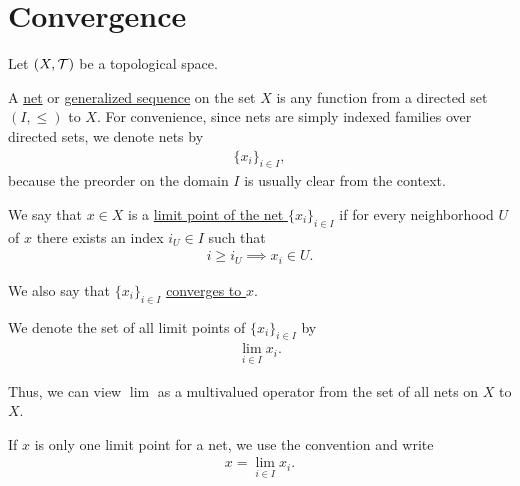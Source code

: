 \section{Convergence}\label{sec:convergence}

Let $(X, \mathcal T)$ be a topological space.

\begin{definition}\label{def:topological_net}\cite[49]{Engelking1989}
  A \ul{net} or \ul{generalized sequence} on the set $X$ is any function from a directed set $(I, \leq)$ to $X$. For convenience, since nets are simply indexed families over directed sets, we denote nets by
  \begin{align*}
    \{ x_i \}_{i \in I},
  \end{align*}
  because the preorder on the domain $I$ is usually clear from the context.
\end{definition}

\begin{definition}\label{def:net_limit_point}\cite[49]{Engelking1989}
  We say that $x \in X$ is a \ul{limit point of the net $\{ x_i \}_{i \in I}$} if for every neighborhood $U$ of $x$ there exists an index $i_U \in I$ such that
  \begin{align*}
    i \geq i_U \implies x_i \in U.
  \end{align*}

  We also say that $\{ x_i \}_{i \in I}$ \ul{converges to $x$}.

  We denote the set of all limit points of $\{ x_i \}_{i \in I}$ by
  \begin{align*}
    \lim_{i \in I} x_i.
  \end{align*}

  Thus, we can view $\lim$ as a multivalued operator from the set of all nets on $X$ to $X$.

  If $x$ is only one limit point for a net, we use the convention and write
  \begin{align*}
    x = \lim_{i \in I} x_i.
  \end{align*}
\end{definition}

